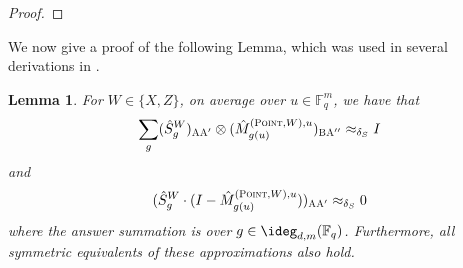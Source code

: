 \documentclass[11pt]{article}
\newtheorem{lemma}[theorem]{Lemma}
\theoremstyle{definition}
\newcommand{\Id}{\ensuremath{I}}
\newcommand{\F}{\ensuremath{\mathbb{F}}}
\newcommand{\labelstyle}[1]{\ensuremath{\textsc{#1}}\xspace}
\newcommand{\alice}{\labelstyle{A}}
\newcommand{\bob}{\labelstyle{B}}
\newcommand{\typestyle}[1]{\ensuremath{\textsc{#1}}\xspace}
\newcommand{\Point}{\typestyle{Point}}
\begin{document}
\begin{proof}
		

\end{proof}


We now give a proof of the following Lemma, which was used in several derivations in . 
\begin{lemma}
\label{lem:qld-constructing-the-paulis-helper}
	For $W \in \{X,Z\}$, on average over $u \in \F_q^m$, we have that
	\begin{gather}
		\label{eq:qld-sg-cons}
		\sum_g (\hat{S}^W_g)_{\alice \alice'} \otimes (\hat{M}^{(\Point,W),u}_{g(u)})_{\bob \alice''} \approx_{\delta_S} \Id
	\end{gather}
	and
	\begin{gather}
		\label{eq:qld-sg-cons2}
		(\hat{S}^W_g \cdot (\Id - \hat{M}^{(\Point, W), u}_{g(u)}))_{\alice \alice'} \approx_{\delta_S} 0
	\end{gather}
	where the answer summation is over $g \in \ideg_{d,m}(\F_q)$.
      Furthermore, all symmetric equivalents of these approximations
      also hold.
\end{lemma}
\end{document}
